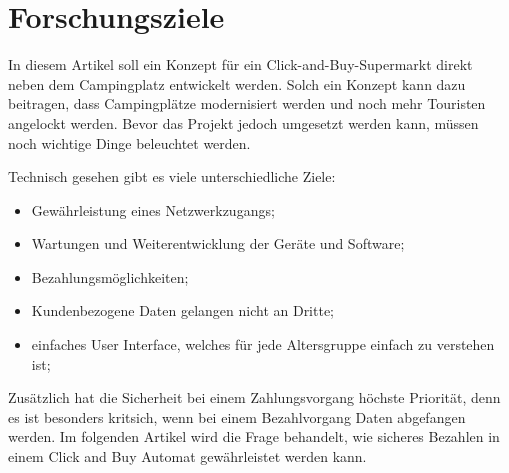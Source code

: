 \section{Forschungsziele}


In diesem Artikel soll ein Konzept für ein Click-and-Buy-Supermarkt direkt neben dem Campingplatz 
entwickelt werden. Solch ein Konzept kann dazu beitragen, dass Campingplätze modernisiert werden 
und noch mehr Touristen angelockt werden. Bevor das Projekt jedoch umgesetzt werden kann, müssen 
noch wichtige Dinge beleuchtet werden. 

Technisch gesehen gibt es viele unterschiedliche Ziele:
\begin{itemize}
    \item Gewährleistung eines Netzwerkzugangs;
    \item Wartungen und Weiterentwicklung der Geräte und Software;
    \item Bezahlungsmöglichkeiten;
    \item  Kundenbezogene Daten gelangen nicht an Dritte;
    \item einfaches User Interface, welches für jede Altersgruppe einfach zu verstehen ist;
\end{itemize}

Zusätzlich hat die Sicherheit bei einem Zahlungsvorgang höchste Priorität, denn es ist besonders kritsich, 
wenn bei einem Bezahlvorgang Daten abgefangen werden. Im folgenden Artikel wird die Frage behandelt, 
wie sicheres Bezahlen in einem Click and Buy Automat gewährleistet werden kann.

%
%
%
%

%
%
%
%
%